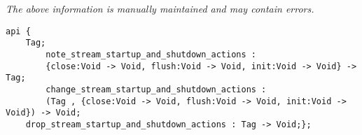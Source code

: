 \label{api:Io\_Startup\_And\_Shutdown\_\_Premicrothread}

{\tiny \it The above information is manually maintained and may contain errors.}
\begin{verbatim}
api {
    Tag;
        note_stream_startup_and_shutdown_actions :
        {close:Void -> Void, flush:Void -> Void, init:Void -> Void} -> Tag;
        change_stream_startup_and_shutdown_actions :
        (Tag , {close:Void -> Void, flush:Void -> Void, init:Void -> Void}) -> Void;
    drop_stream_startup_and_shutdown_actions : Tag -> Void;};
\end{verbatim}
